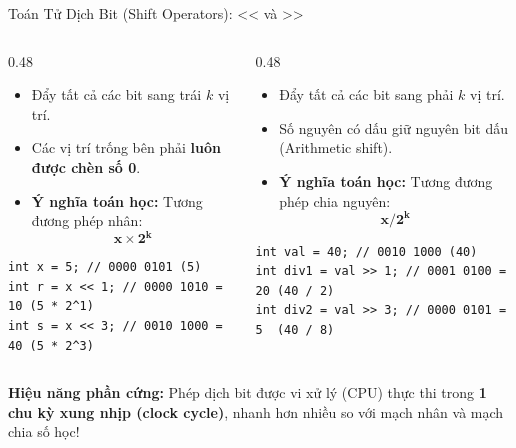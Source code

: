 \documentclass[aspectratio=169, 10pt]{beamer}
\begin{document}
\begin{frame}[fragile]{Toán Tử Dịch Bit (Shift Operators): << và >>}
  \begin{columns}[T]
    \begin{column}{0.48\textwidth}
      \begin{tcolorbox}[colback=UniGreen!10,colframe=UniGreen,title=\textbf{Dịch trái (Left Shift: \texttt{x << k})},fonttitle=\small\bfseries]
        \begin{itemize}\small
          \item Đẩy tất cả các bit sang trái $k$ vị trí.
          \item Các vị trí trống bên phải \textbf{luôn được chèn số 0}.
          \item \textbf{Ý nghĩa toán học:} Tương đương phép nhân:
            $$\mathbf{x \times 2^k}$$
        \end{itemize}
\begin{lstlisting}[numbers=none]
int x = 5; // 0000 0101 (5)
int r = x << 1; // 0000 1010 = 10 (5 * 2^1)
int s = x << 3; // 0010 1000 = 40 (5 * 2^3)
\end{lstlisting}
      \end{tcolorbox}
    \end{column}

    \begin{column}{0.48\textwidth}
      \begin{tcolorbox}[colback=UniOrange!10,colframe=UniOrange,title=\textbf{Dịch phải (Right Shift: \texttt{x >> k})},fonttitle=\small\bfseries]
        \begin{itemize}\small
          \item Đẩy tất cả các bit sang phải $k$ vị trí.
          \item Số nguyên có dấu giữ nguyên bit dấu (Arithmetic shift).
          \item \textbf{Ý nghĩa toán học:} Tương đương phép chia nguyên:
            $$\mathbf{x / 2^k}$$
        \end{itemize}
\begin{lstlisting}[numbers=none]
int val = 40; // 0010 1000 (40)
int div1 = val >> 1; // 0001 0100 = 20 (40 / 2)
int div2 = val >> 3; // 0000 0101 = 5  (40 / 8)
\end{lstlisting}
      \end{tcolorbox}
    \end{column}
  \end{columns}

  \begin{exampleblock}{\textbf{Hiệu năng phần cứng:}}
    Phép dịch bit được vi xử lý (CPU) thực thi trong \textbf{1 chu kỳ xung nhịp (clock cycle)}, nhanh hơn nhiều so với mạch nhân và mạch chia số học!
  \end{exampleblock}
\end{frame}
\end{document}
